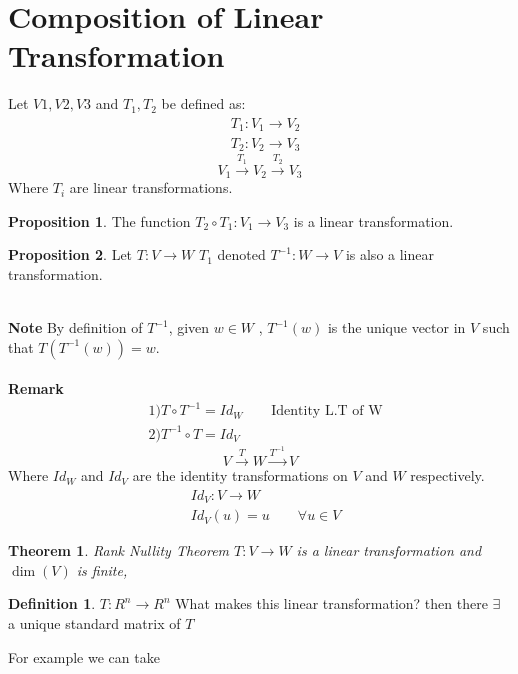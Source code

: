 \documentclass[
12pt,
]{article}
\newcommand{\tvw}{T : V\xrightarrow{} W }
\newtheorem{theorem}{Theorem}[section]
\theoremstyle{definition}
\theoremstyle{definition}
\theoremstyle{definition}
\newtheorem{Definition}{Definition}[section]
\theoremstyle{definition}
\newtheorem{Proposition}{Proposition}[section]
\begin{document}
\section{Composition of Linear Transformation}
Let $V1,V2,V3 $ and $T_1, T_2$ be defined as:
\begin{align*}
    &T_1 : V_1 \xrightarrow{} V_2 \\
    &T_2 : V_2 \xrightarrow{} V_3 
\end{align*}
 \large$$ V_1 \xrightarrow{T_1} V_2 \xrightarrow{T_2} V_3$$
\normalsize
Where $T_i$ are linear transformations. 
\begin{Proposition}
The function $T_2 \circ T_1 : V_1 \xrightarrow{} V_3$ is a linear transformation. 
\end{Proposition}
\begin{Proposition}Let $\tvw$  $T_1$ denoted $T^{-1} : W \xrightarrow{} V$ is also a linear transformation. 
\end{Proposition} \\
\textbf{Note} By definition of $T^{-1}$, given $w \in W $ , $T^{-1}(w)$ is the unique vector in $V$ such that $T(T^{-1}(w))=w$. \\
\\
\textbf{Remark} 
\begin{align*}
    &1) T\circ T^{-1} = Id_W\quad\quad \text{Identity L.T of W} \\
    &2) T^{-1} \circ T = Id_V   
\end{align*}
 \large$$ V \xrightarrow{T} W \xrightarrow{T^{-1}} V$$
\normalsize
\quad\quad Where $Id_W$ and $Id_V$ are the identity transformations on $V$ and $W$ respectively. 
\begin{align*}
     &Id_V : V \xrightarrow{} W \\
     &Id_V(u) = u \quad\quad \forall u \in V
\end{align*}
\begin{theorem}{Rank Nullity Theorem}
\normalfont $\tvw$ is a linear transformation and $ \dim(V)$ is finite,
\end{theorem}
\begin{center}
\end{center}
\begin{Definition}
$T : R^{n}\xrightarrow{} R^{n} $ What makes this linear transformation? \newline
then there $\exists $ a unique standard matrix of $T$ 
\end{Definition}
For example we can take 
\end{document}
